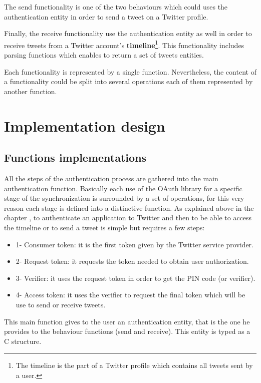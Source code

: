 The send functionality is one of the two behaviours which could uses the authentication entity in order to send a tweet on a Twitter profile.

Finally, the receive functionality use the authentication entity as well in order to receive tweets from a Twitter account's \textbf{timeline}\footnote{The timeline is the part of a Twitter profile which contains all tweets sent by a user.}. This functionality includes parsing functions which enables to return a set of tweets entities. 

Each functionality is represented by a single function. Nevertheless, the content of a functionality could be split into several operations each of them represented by another function.



\section{Implementation design}


\subsection{Functions implementations}

\hspace{15mm}All the steps of the authentication process are gathered into the main authentication function. Basically each use of the OAuth library for a specific stage of the synchronization is surrounded by a set of operations, for this very reason each stage is defined into a distinctive function. As explained above in the chapter , to authenticate an application to Twitter and then to be able to access the timeline or to send a tweet is simple but requires a few steps:
\begin{itemize}
\item 1- Consumer token: it is the first token given by the Twitter service provider.
\item 2- Request token: it requests the token needed to obtain user authorization.
\item 3- Verifier: it uses the request token in order to get the PIN code (or verifier). 
\item 4- Access token: it uses the verifier to request the final token which will be use to send or receive tweets.
\end{itemize}
This main function gives to the user an authentication entity, that is the one he provides to the behaviour functions (send and receive). This entity is typed as a C structure.

